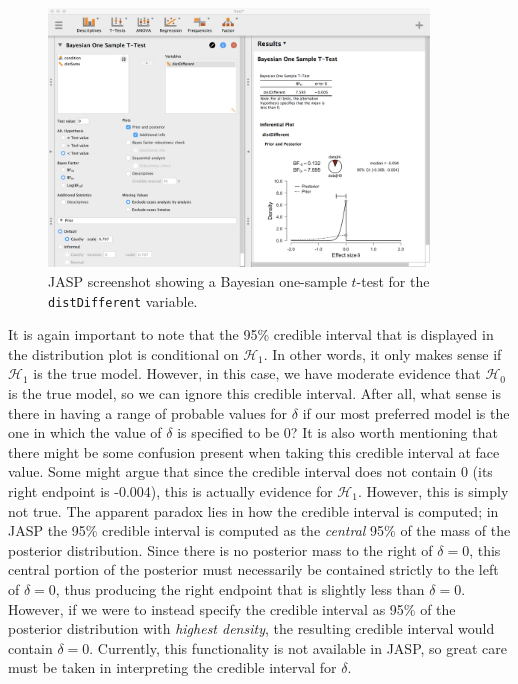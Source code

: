 \documentclass[english,,doc,floatsintext]{apa6}
\begin{document}
\begin{figure}
\centering
\includegraphics[width=0.9\textwidth,height=\textheight]{figures/ttestBayes2.png}
\caption{\label{fig:ttestBayes2}JASP screenshot showing a Bayesian one-sample \(t\)-test for the \texttt{distDifferent} variable.}
\end{figure}

It is again important to note that the 95\% credible interval that is displayed in the distribution plot is conditional on \(\mathcal{H}_1\). In other words, it only makes sense if \(\mathcal{H}_1\) is the true model. However, in this case, we have moderate evidence that \(\mathcal{H}_0\) is the true model, so we can ignore this credible interval. After all, what sense is there in having a range of probable values for \(\delta\) if our most preferred model is the one in which the value of \(\delta\) is specified to be 0? It is also worth mentioning that there might be some confusion present when taking this credible interval at face value. Some might argue that since the credible interval does not contain 0 (its right endpoint is -0.004), this is actually evidence for \(\mathcal{H}_1\). However, this is simply not true. The apparent paradox lies in how the credible interval is computed; in JASP the 95\% credible interval is computed as the \emph{central} 95\% of the mass of the posterior distribution. Since there is no posterior mass to the right of \(\delta=0\), this central portion of the posterior must necessarily be contained strictly to the left of \(\delta=0\), thus producing the right endpoint that is slightly less than \(\delta=0\). However, if we were to instead specify the credible interval as 95\% of the posterior distribution with \emph{highest density}, the resulting credible interval would contain \(\delta=0\). Currently, this functionality is not available in JASP, so great care must be taken in interpreting the credible interval for \(\delta\).
\end{document}
